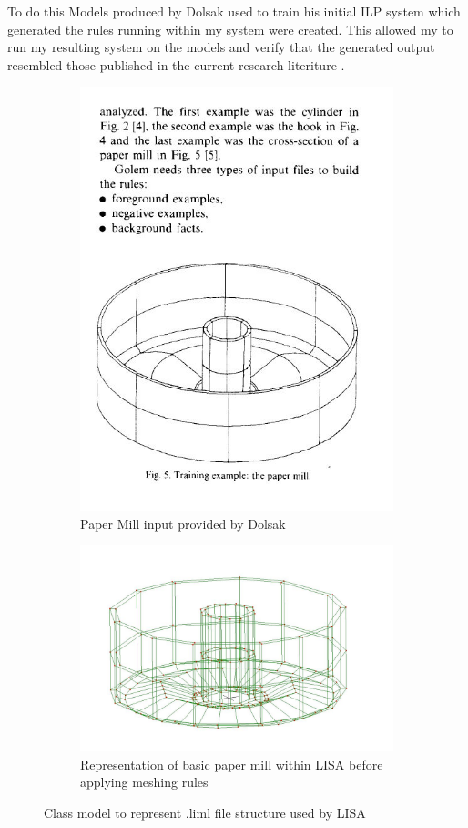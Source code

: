 \documentclass{article}
\begin{document}
To do this Models produced by Dolsak used to train his initial ILP system which generated the rules running within my system were created. This allowed my to run my resulting system on the models and verify that the generated output resembled those published in the current research literiture \cite{DolsakPaper91}.


\begin{figure}
\centering
\begin{subfigure}{.5\textwidth}
  \centering
  \includegraphics[width=0.9\linewidth]{PaperMillDolsak.jpeg}
  \caption{Paper Mill input provided by Dolsak}
  \label{fig:sub1}
\end{subfigure}%
\begin{subfigure}{.5\textwidth}
  \centering
  \includegraphics[width=0.9\linewidth]{PaperMillWithinLisa.jpeg}
  \caption{Representation of basic paper mill within LISA before applying meshing rules}
  \label{fig:sub2}
\end{subfigure}
\label{fig:test}
\caption{Class model to represent .liml file structure used by LISA}
\end{figure}
\end{document}
